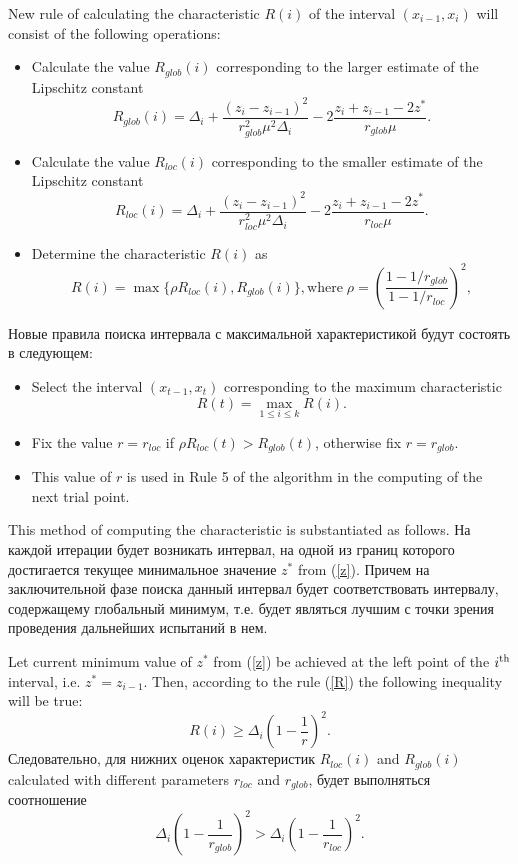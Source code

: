 \documentclass[runningheads]{llncs}
\begin{document}
New rule of calculating the characteristic $R(i)$ of the interval $(x_{i-1}, x_i)$ will consist of the following operations:
\begin{itemize}
\item
Calculate the value $R_{glob}(i)$ corresponding to the larger estimate of the Lipschitz constant
\[
R_{glob}(i)=\Delta_i+\frac{(z_i-z_{i-1})^2}{r_{glob}^2\mu^2\Delta_i}-2\frac{z_i+z_{i-1}-2z^*}{r_{glob}\mu}.
\]
\item
Calculate the value $R_{loc}(i)$ corresponding to the smaller estimate of the Lipschitz constant
\[
R_{loc}(i)=\Delta_i+\frac{(z_i-z_{i-1})^2}{r_{loc}^2\mu^2\Delta_i}-2\frac{z_i+z_{i-1}-2z^*}{r_{loc}\mu}.
\]
\item
Determine the characteristic $R(i)$ as
\begin{equation}\label{pho}
R(i) = \max\{\rho R_{loc}(i),R_{glob}(i)\}, \textrm{where} \; \rho = \left(\frac{1-1/r_{glob}}{1-1/r_{loc}}\right)^2,
\end{equation}   
\end{itemize}

Новые правила поиска интервала с максимальной характеристикой будут состоять в следующем:
\begin{itemize}
\item 
Select the interval $(x_{t-1},x_t)$ corresponding to the maximum characteristic
\[
R(t)= \max_{1 \leq i \leq k}R(i).
\]
\item
Fix the value $r = r_{loc}$ if $\rho R_{loc}(t) > R_{glob}(t)$, otherwise fix $r=r_{glob}$.
\item
This value of $r$ is used in Rule 5 of the algorithm in the computing of the next trial point.
\end{itemize}


This method of computing the characteristic is substantiated as follows. 
На каждой итерации будет возникать интервал, на одной из границ которого достигается текущее минимальное значение $z^*$ from (\ref{z}). Причем на заключительной фазе поиска данный интервал будет соответствовать интервалу, содержащему глобальный минимум, т.е. будет являться лучшим с точки зрения проведения дальнейших испытаний в нем.

Let current minimum value of $z^*$ from (\ref{z}) be achieved at the left point of the $i^{\rm th}$ interval, i.e. $z^* = z_{i-1}$. Then, according to the rule (\ref{R}) the following inequality will be true: 
\[
R(i) \geq \Delta_i \left( 1 - \frac{1}{r} \right)^2.
\]
Следовательно, для нижних оценок характеристик $R_{loc}(i)$ and $R_{glob}(i)$ calculated with different parameters $r_{loc}$ and $r_{glob}$, будет выполняться соотношение
\[
	\Delta_i \left( 1 - \frac{1}{r_{glob}} \right)^2 > \Delta_i \left( 1 - \frac{1}{r_{loc}} \right)^2.
\]
\end{document}
